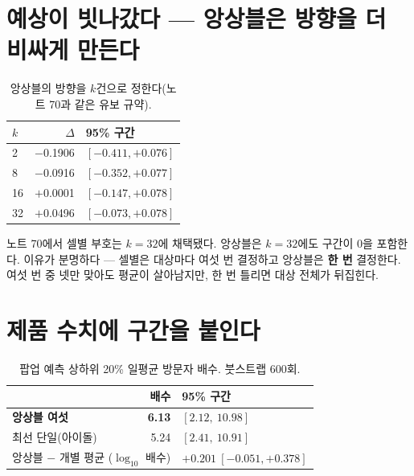 \documentclass[10pt]{article}
\begin{document}

\section{예상이 빗나갔다 --- 앙상블은 방향을 더 비싸게 만든다}

\begin{table}[t]
\centering\tsize
\caption{앙상블의 방향을 $k$건으로 정한다(노트 70과 같은 유보 규약).}
\begin{tabular}{lrl}
\toprule
$k$ & $\Delta$ & 95\% 구간 \\
\midrule
2 & $-$0.1906 & $[-0.411, +0.076]$ \\
8 & $-$0.0916 & $[-0.352, +0.077]$ \\
16 & $+$0.0001 & $[-0.147, +0.078]$ \\
32 & $+$0.0496 & $[-0.073, +0.078]$ \\
\bottomrule
\end{tabular}
\end{table}

노트 70에서 셀별 부호는 $k{=}32$에 채택됐다. 앙상블은 $k{=}32$에도 구간이 0을
포함한다. 이유가 분명하다 --- 셀별은 대상마다 여섯 번 결정하고 앙상블은 \textbf{한
번} 결정한다. 여섯 번 중 넷만 맞아도 평균이 살아남지만, 한 번 틀리면 대상 전체가
뒤집힌다.


\section{제품 수치에 구간을 붙인다}

\begin{table}[t]
\centering\tsize
\caption{팝업 예측 상하위 20\% 일평균 방문자 배수. 붓스트랩 600회.}
\begin{tabular}{lrl}
\toprule
& 배수 & 95\% 구간 \\
\midrule
\textbf{앙상블 여섯} & \textbf{6.13} & $[2.12,\ 10.98]$ \\
최선 단일(아이돌) & 5.24 & $[2.41,\ 10.91]$ \\
\midrule
\multicolumn{2}{l}{앙상블 $-$ 개별 평균 ($\log_{10}$ 배수)} &
$+0.201\ [-0.051, +0.378]$ \\
\bottomrule
\end{tabular}
\end{table}
\end{document}
